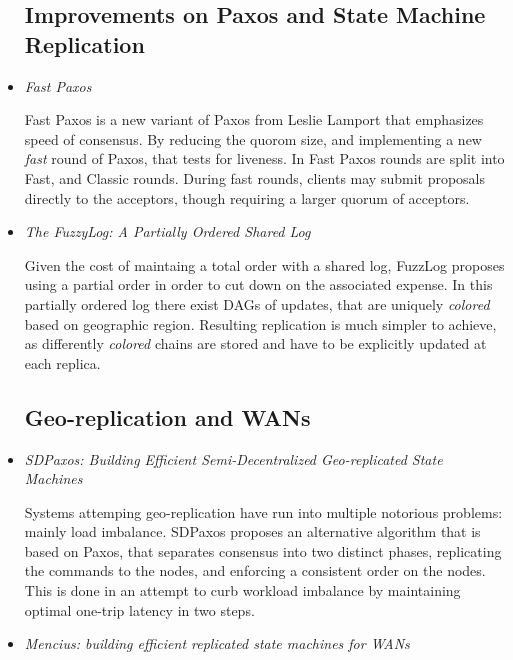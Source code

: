 \documentclass{article}
\begin{document}
\begin{itemize}

	\subsection{Improvements on Paxos and State Machine Replication}

	\item
	\textit{Fast Paxos} \cite{lamport2006fast}

	Fast Paxos is a new variant of Paxos from Leslie Lamport that emphasizes speed of consensus.
	By reducing the quorom size, and implementing a new \textit{fast} round of Paxos, that tests for liveness.
	In Fast Paxos rounds are split into Fast, and Classic rounds. During fast rounds, clients may submit proposals directly to the acceptors, though requiring a larger quorum of acceptors.

	\item
	\textit{The FuzzyLog: A Partially Ordered Shared Log} \cite{FuzzyLog}

	Given the cost of maintaing a total order with a shared log, FuzzLog proposes using a partial order in order to cut down on the associated expense.
	In this partially ordered log there exist DAGs of updates, that are uniquely \textit{colored} based on geographic region.
	Resulting replication is much simpler to achieve, as differently \textit{colored} chains are stored and have to be explicitly updated at each replica.


	\subsection{Geo-replication and WANs}

	\item
	\textit{SDPaxos: Building Efficient Semi-Decentralized Geo-replicated State Machines} \cite{zhao2018sdpaxos}

	Systems attemping geo-replication have run into multiple notorious problems: mainly load imbalance.
	SDPaxos proposes an alternative algorithm that is based on Paxos, that separates consensus into two distinct phases, replicating the commands to the nodes, and enforcing a consistent order on the nodes.
	This is done in an attempt to curb workload imbalance by maintaining optimal one-trip latency in two steps.

	\item
	\textit{Mencius: building efficient replicated state machines for WANs} \cite{Mencius}


\end{itemize}
\end{document}
